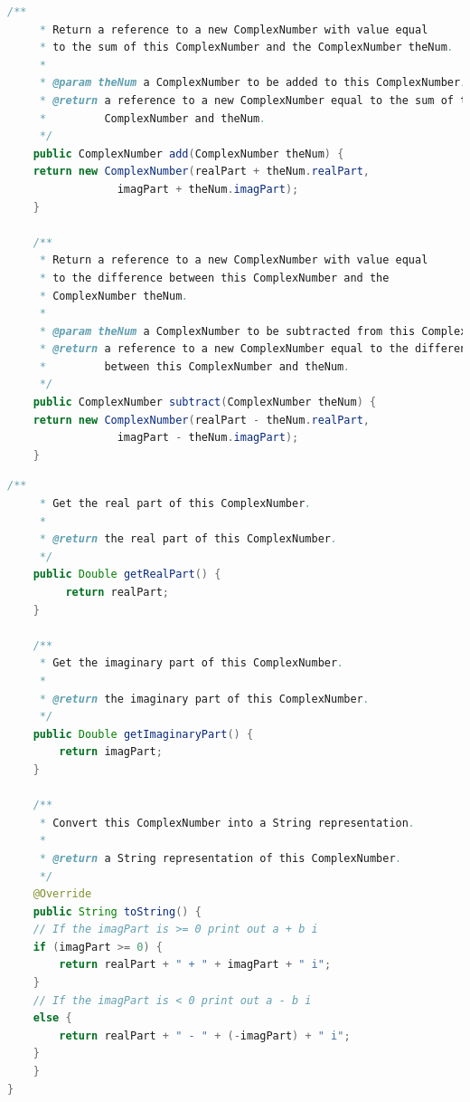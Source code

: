 \documentclass[11pt, xcolor=svgnames]{beamer}
\begin{document}
\begin{frame}[fragile]
\begin{lstlisting}[language=Java,basicstyle=\tiny]
  /**
     * Return a reference to a new ComplexNumber with value equal
     * to the sum of this ComplexNumber and the ComplexNumber theNum.
     *
     * @param theNum a ComplexNumber to be added to this ComplexNumber.
     * @return a reference to a new ComplexNumber equal to the sum of this
     *         ComplexNumber and theNum.
     */
    public ComplexNumber add(ComplexNumber theNum) {
	return new ComplexNumber(realPart + theNum.realPart,
				 imagPart + theNum.imagPart);
    }

    /**
     * Return a reference to a new ComplexNumber with value equal
     * to the difference between this ComplexNumber and the
     * ComplexNumber theNum.
     *
     * @param theNum a ComplexNumber to be subtracted from this ComplexNumber.
     * @return a reference to a new ComplexNumber equal to the difference
     *         between this ComplexNumber and theNum.
     */
    public ComplexNumber subtract(ComplexNumber theNum) {
	return new ComplexNumber(realPart - theNum.realPart,
				 imagPart - theNum.imagPart);
    }

\end{lstlisting}
\end{frame}



\begin{frame}[fragile]
\begin{lstlisting}[language=JAVA,basicstyle=\tiny]
    /**
     * Get the real part of this ComplexNumber.
     *
     * @return the real part of this ComplexNumber.
     */
    public Double getRealPart() {
	     return realPart;
    }

    /**
     * Get the imaginary part of this ComplexNumber.
     *
     * @return the imaginary part of this ComplexNumber.
     */
    public Double getImaginaryPart() {
	    return imagPart;
    }

    /**
     * Convert this ComplexNumber into a String representation.
     *
     * @return a String representation of this ComplexNumber.
     */
    @Override
    public String toString() {
	// If the imagPart is >= 0 print out a + b i
	if (imagPart >= 0) {
	    return realPart + " + " + imagPart + " i";
	}
	// If the imagPart is < 0 print out a - b i
	else {
	    return realPart + " - " + (-imagPart) + " i";
	}
    }
}
\end{lstlisting}
\end{frame}
\end{document}
